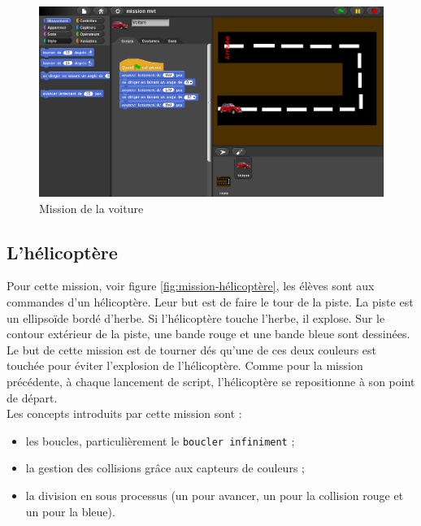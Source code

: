 \begin{figure}
  \begin{center}
    \includegraphics[width=\textwidth]{content/7-solution/1-missions/images/voiture}
    \caption{Mission de la voiture}
    \label{fig:mission-voiture}
  \end{center}
\end{figure}


\subsection{L'hélicoptère}
\label{mission-helicoptere}
Pour cette mission, voir figure \ref{fig:mission-hélicoptère}, les élèves sont aux commandes d'un hélicoptère. Leur but est de faire le tour de la piste. La piste est un ellipsoïde bordé d'herbe. Si l'hélicoptère touche l'herbe, il explose. Sur le contour extérieur de la piste, une bande rouge et une bande bleue sont dessinées. Le but de cette mission est de tourner dés qu'une de ces deux couleurs est touchée pour éviter l'explosion de l'hélicoptère. Comme pour la mission précédente, à chaque lancement de script, l'hélicoptère se repositionne à son point de départ.\\

Les concepts introduits par cette mission sont :
\begin{itemize}
\item les boucles, particulièrement le \texttt{boucler infiniment} ;
\item la gestion des collisions grâce aux capteurs de couleurs ;
\item la division en sous processus (un pour avancer, un pour la collision rouge et un pour la bleue).
\end{itemize}

